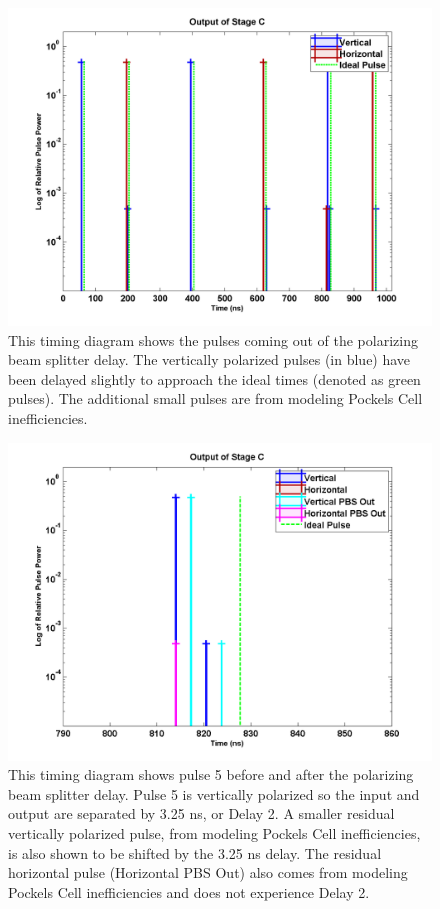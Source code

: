 \documentclass[pdftex,12pt,a4paper]{article}
\begin{document}
\begin{figure}[H]
\centering
\includegraphics[scale=0.6]{PBSDelayOut.png} \caption{This timing diagram shows the pulses coming out of the polarizing beam splitter delay. The vertically polarized pulses (in blue) have been delayed slightly to approach the ideal times (denoted as green pulses). The additional small pulses are from modeling Pockels Cell inefficiencies.}
\label{fig:timing_C}
\end{figure}


\begin{figure}[H]
\centering
\includegraphics[scale=0.6]{pulse5PBSOut.png} \caption{This timing diagram shows pulse 5 before and after the polarizing beam splitter delay. Pulse 5 is vertically polarized so the input and output are separated by 3.25 ns, or Delay 2. A smaller residual vertically polarized pulse, from modeling Pockels Cell inefficiencies, is also shown to be shifted by the 3.25 ns delay. The residual horizontal pulse (Horizontal PBS Out) also comes from modeling Pockels Cell inefficiencies and does not experience Delay 2.}
\label{fig:pulse5_C}
\end{figure}
\end{document}
